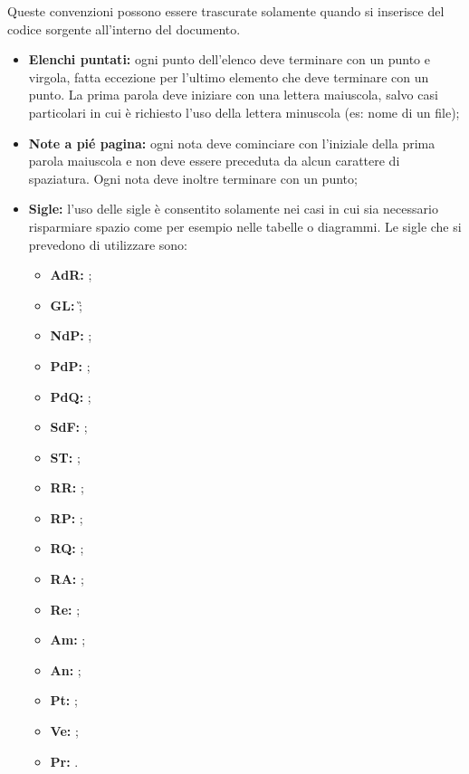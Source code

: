 Queste convenzioni possono essere trascurate solamente quando si inserisce del codice sorgente all'interno del documento.
\begin{itemize}
\item \textbf{Elenchi puntati:} ogni punto dell'elenco deve terminare con un punto e virgola, fatta eccezione per l'ultimo elemento che deve terminare con un punto. La prima parola deve iniziare con una lettera maiuscola, salvo casi particolari in cui è richiesto l'uso della lettera minuscola (es: nome di un file);
\item \textbf{Note a pié pagina:} ogni nota deve cominciare con l'iniziale della prima parola maiuscola e non deve essere preceduta da alcun carattere di spaziatura. Ogni nota deve inoltre terminare con un punto;
\item \textbf{Sigle:} l'uso delle sigle è consentito solamente nei casi in cui sia necessario risparmiare spazio come per esempio nelle tabelle o diagrammi. Le sigle che si prevedono di utilizzare sono:
\begin{itemize}
\item \textbf{AdR:} \AR;
\item \textbf{GL:} \G;
\item \textbf{NdP:} \NP;
\item \textbf{PdP:} \PP;
\item \textbf{PdQ:} \PQ;
\item \textbf{SdF:} \SF;
\item \textbf{ST:} \ST;
\item \textbf{RR:} \RR;
\item \textbf{RP:} \RP;
\item \textbf{RQ:} \RQ;
\item \textbf{RA:} \RA;
\item \textbf{Re:} \rRP;
\item \textbf{Am:} \rAP;
\item \textbf{An:} \rA;
\item \textbf{Pt:} \rP;
\item \textbf{Ve:} \rV;
\item \textbf{Pr:} \rp.
\end{itemize}
\end{itemize}
